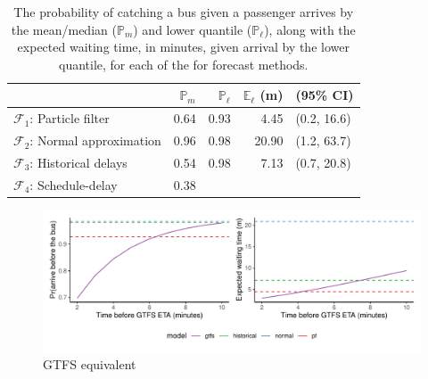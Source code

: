 \begin{knitrout}\small
{}\color{fgcolor}\begin{table}

\caption{\label{tab:model_results_pr_miss}The probability of catching a bus given a passenger arrives by the mean/median ($\mathbb{P}_m$) and lower quantile ($\mathbb{P}_\ell$), along with the expected waiting time, in minutes, given arrival by the lower quantile, for each of the for forecast methods.}
\centering
\fontsize{8}{10}\selectfont
\begin{tabular}[t]{lrrrl}
\toprule
  & $\mathbb{P}_m$ & $\mathbb{P}_\ell$ & $\mathbb{E}_\ell$ (m) & (95\% CI)\\
\midrule
$\mathcal{F}_1$: Particle filter & 0.64 & 0.93 & 4.45 & (0.2, 16.6)\\
$\mathcal{F}_2$: Normal approximation & 0.96 & 0.98 & 20.90 & (1.2, 63.7)\\
$\mathcal{F}_3$: Historical delays & 0.54 & 0.98 & 7.13 & (0.7, 20.8)\\
$\mathcal{F}_4$: Schedule-delay & 0.38 &  &  & \\
\bottomrule
\end{tabular}
\end{table}


\end{knitrout}

\begin{knitrout}\small
{}\color{fgcolor}\begin{figure}

{\centering \includegraphics[width=\textwidth]{figure/model_results_pr_gtfs-1} 

}

\caption[GTFS equivalent]{GTFS equivalent}\label{fig:model_results_pr_gtfs}
\end{figure}


\end{knitrout}


